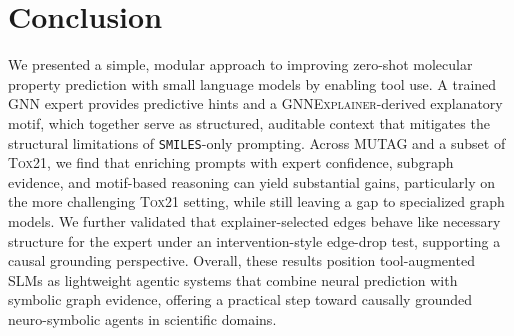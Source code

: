 \documentclass[
]{ceurart}
\newcommand{\dataset}[1]{\textsc{#1}}
\newcommand{\smiles}{\texttt{SMILES}}
\newcommand{\gnne}{\textsc{GNNExplainer}}
\begin{document}


\section{Conclusion}
\label{sec:concl}
We presented a simple, modular approach to improving zero-shot molecular property prediction with small language models by enabling tool use.
A trained GNN expert provides predictive hints and a \gnne{}-derived explanatory motif, which together serve as structured, auditable context that mitigates
the structural limitations of \smiles{}-only prompting.
Across \dataset{MUTAG} and a subset of \dataset{Tox21}, we find that enriching prompts with expert confidence, subgraph evidence, and motif-based reasoning
can yield substantial gains, particularly on the more challenging \dataset{Tox21} setting, while still leaving a gap to specialized graph models.
We further validated that explainer-selected edges behave like necessary structure for the expert under an intervention-style edge-drop test,
supporting a causal grounding perspective.
Overall, these results position tool-augmented SLMs as lightweight agentic systems that combine neural prediction with symbolic graph evidence,
offering a practical step toward causally grounded neuro-symbolic agents in scientific domains.
\end{document}
